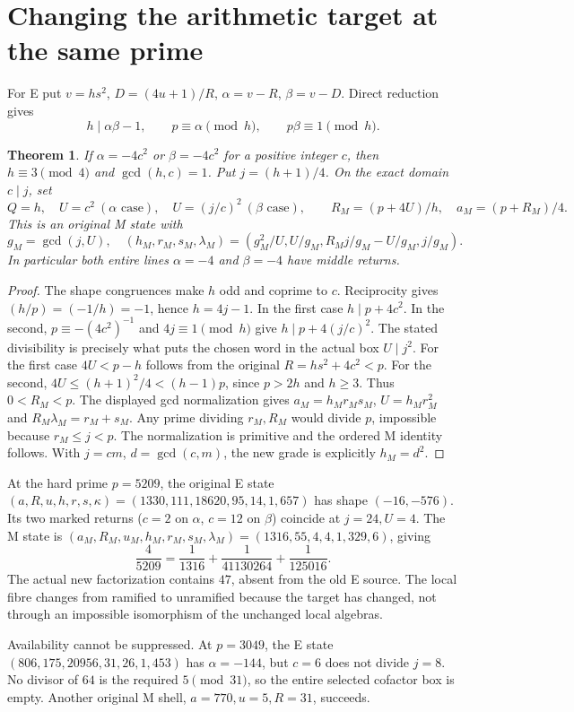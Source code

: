 \documentclass[11pt,reqno]{amsart}
\newtheorem{theorem}{Theorem}\newtheorem{lemma}{Lemma}
\begin{document}
\section{Changing the arithmetic target at the same prime}
For E put $v=hs^2$, $D=(4u+1)/R$, $\alpha=v-R$, $\beta=v-D$. Direct reduction gives
\[
 h\mid\alpha\beta-1,\qquad p\equiv\alpha\pmod h,
 \qquad p\beta\equiv1\pmod h.
\]
\begin{theorem}
If $\alpha=-4c^2$ or $\beta=-4c^2$ for a positive integer $c$, then
$h\equiv3\pmod4$ and $\gcd(h,c)=1$. Put $j=(h+1)/4$.
On the exact domain $c\mid j$, set
\[
 Q=h,\quad U=c^2\ (\alpha\text{ case}),\quad
 U=(j/c)^2\ (\beta\text{ case}),\qquad
 R_M=(p+4U)/h,\quad a_M=(p+R_M)/4.
\]
This is an original M state with
\[
 g_M=\gcd(j,U),\quad
 (h_M,r_M,s_M,\lambda_M)=
 (g_M^2/U,U/g_M,R_Mj/g_M-U/g_M,j/g_M).
\]
In particular both entire lines $\alpha=-4$ and $\beta=-4$ have middle returns.
\end{theorem}
\begin{proof}
The shape congruences make $h$ odd and coprime to $c$. Reciprocity gives
$(h/p)=(-1/h)=-1$, hence $h=4j-1$. In the first case $h\mid p+4c^2$.
In the second, $p\equiv-(4c^2)^{-1}$ and $4j\equiv1\pmod h$ give
$h\mid p+4(j/c)^2$. The stated divisibility is precisely what puts the
chosen word in the actual box $U\mid j^2$.
For the first case $4U<p-h$ follows from the original $R=hs^2+4c^2<p$.
For the second, $4U\le(h+1)^2/4<(h-1)p$, since $p>2h$ and $h\ge3$.
Thus $0<R_M<p$. The displayed gcd normalization gives $a_M=h_Mr_Ms_M$,
$U=h_Mr_M^2$ and $R_M\lambda_M=r_M+s_M$.
Any prime dividing $r_M,R_M$ would divide $p$, impossible because $r_M\le j<p$.
The normalization is primitive and the ordered M identity follows. With
$j=cm$, $d=\gcd(c,m)$, the new grade is explicitly $h_M=d^2$.
\end{proof}

At the hard prime $p=5209$, the original E state
$(a,R,u,h,r,s,\kappa)=(1330,111,18620,95,14,1,657)$ has shape
$(-16,-576)$. Its two marked returns ($c=2$ on $\alpha$, $c=12$ on $\beta$)
coincide at $j=24,U=4$. The M state is $(a_M,R_M,u_M,h_M,r_M,s_M,\lambda_M)
=(1316,55,4,4,1,329,6)$, giving
\[
 \frac4{5209}=\frac1{1316}+\frac1{41130264}+\frac1{125016}.
\]
The actual new factorization contains $47$, absent from the old E source. The
local fibre changes from ramified to unramified because the target has changed,
not through an impossible isomorphism of the unchanged local algebras.

Availability cannot be suppressed. At $p=3049$, the E state
$(806,175,20956,31,26,1,453)$ has $\alpha=-144$, but $c=6$ does not divide $j=8$.
No divisor of $64$ is the required $5\pmod{31}$, so the entire selected cofactor
box is empty. Another original M shell, $a=770,u=5,R=31$, succeeds.
\end{document}
